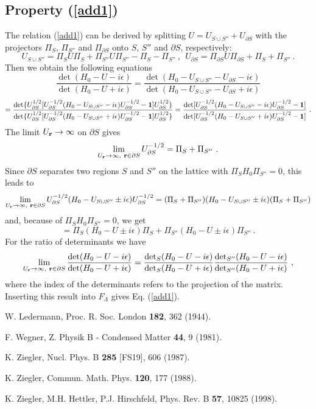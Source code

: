 \documentclass[aps]{revtex4}
\def\beq{\begin{equation}}
\def\eeq{\end{equation}}
\def\br{{\bf r}}
\begin{document}
\subsection{Property (\ref{add1})}

The relation (\ref{add1}) can be derived by splitting $U=U_{S\cup S''}+U_{\partial S}$ with
the projectors $\Pi_S$, $\Pi_{S''}$ and $\Pi_{\partial S}$ onto $S$, $S''$ and $\partial S$,
respectively:
\[
U_{S\cup S''}=\Pi_SU\Pi_S+\Pi_{S''}U\Pi_{S''}-\Pi_S-\Pi_{S''}
\ ,\ \ 
U_{\partial S}=\Pi_{\partial S}U\Pi_{\partial S}+\Pi_S+\Pi_{S''}
\ .
\]
Then we obtain the following equations
\[
\frac{\det(H_0-U-i\epsilon)}{\det(H_0-U+i\epsilon)}
=\frac{\det(H_0-U_{S\cup S''}-U_{\partial S}-i\epsilon)}
{\det(H_0-U_{S\cup S''}-U_{\partial S}+i\epsilon)}
\]
\beq
=\frac{\det\{U_{\partial S}^{1/2}[
U_{\partial S}^{-1/2}(H_0-U_{S\cup S''}-i\epsilon)U_{\partial S}^{-1/2}-{\bf 1}]U_{\partial S}^{1/2}\}}
{\det\{U_{\partial S}^{1/2}[
U_{\partial S}^{-1/2}(H_0-U_{S\cup S''}+i\epsilon)U_{\partial S}^{-1/2}-{\bf 1}]U_{\partial S}^{1/2}\}}
=\frac{\det[
U_{\partial S}^{-1/2}(H_0-U_{S\cup S''}-i\epsilon)U_{\partial S}^{-1/2}-{\bf 1}]}
{\det[
U_{\partial S}^{-1/2}(H_0-U_{S\cup S''}+i\epsilon)U_{\partial S}^{-1/2}-{\bf 1}]}
\ .
\eeq
The limit $U_\br\to\infty$ on $\partial S$ gives
\beq
\lim_{U_\br\to\infty,\ \br\in \partial S}U_{\partial S}^{-1/2}=\Pi_S+\Pi_{S''}
\ .
\eeq
Since $\partial S$ separates two regions $S$ and $S''$ on the lattice
with $\Pi_SH_0\Pi_{S''}=0$, this leads to
\[
\lim_{U_\br\to\infty,\ \br\in \partial S} U_{\partial S}^{-1/2}(H_0-U_{S\cup S''}\pm i\epsilon)U_{\partial S}^{-1/2}
=(\Pi_S+\Pi_{S''})(H_0-U_{S\cup S''}\pm i\epsilon)(\Pi_S+\Pi_{S''})
\] 
and, because of $\Pi_SH_0\Pi_{S''}=0$, we get
\beq
=\Pi_{S}(H_0-U\pm i\epsilon)\Pi_{S}+\Pi_{S''}(H_0-U\pm i\epsilon)\Pi_{S''}
\ .
\eeq
For the ratio of determinants we have
\beq
\lim_{U_\br\to\infty,\ \br\in \partial S}
\frac{\det(H_0-U-i\epsilon)}{\det(H_0-U+i\epsilon)}
=\frac{\det_S(H_0-U-i\epsilon)}{\det_S(H_0-U+i\epsilon)}
\frac{\det_{S''}(H_0-U-i\epsilon)}{\det_{S''}(H_0-U+i\epsilon)}
\ ,
\eeq
where the index of the determinants refers to the projection of the matrix.
Inserting this result into $F_\Lambda$ gives Eq. (\ref{add1}).


\begin{thebibliography}{99}

W. Ledermann, Proc. R. Soc. London {\bf 182}, 362 (1944).

F. Wegner, Z. Physik B - Condensed Matter {\bf 44}, 9 (1981).

K. Ziegler, Nucl. Phys. B {\bf 285} [FS19], 606 (1987).

K. Ziegler, Commun. Math. Phys. {\bf 120}, 177 (1988).

K. Ziegler, M.H. Hettler, P.J. Hirschfeld, Phys. Rev. B {\bf 57}, 10825 (1998).

\end{thebibliography}
\end{document}
